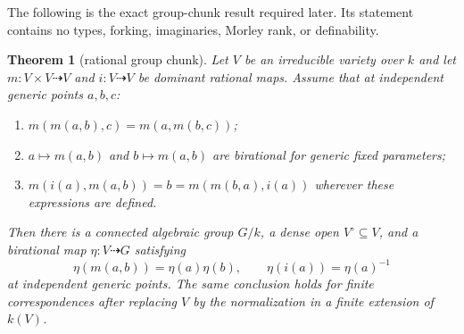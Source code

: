 \documentclass[11pt,oneside]{article}
\newtheorem{theorem}{Theorem}[section]
\theoremstyle{definition}
\theoremstyle{remark}
\begin{document}
The following is the exact group-chunk result required later.  Its statement contains no
types, forking, imaginaries, Morley rank, or definability.

\begin{theorem}[rational group chunk]\label{thm:rational-group-chunk}
Let $V$ be an irreducible variety over $k$ and let
$m:V\times V\dashrightarrow V$ and $i:V\dashrightarrow V$ be dominant rational maps.
Assume that at independent generic points $a,b,c$:
\begin{enumerate}[label=(\roman*),leftmargin=11mm]
\item $m(m(a,b),c)=m(a,m(b,c))$;
\item $a\mapsto m(a,b)$ and $b\mapsto m(a,b)$ are birational for generic fixed
parameters;
\item $m(i(a),m(a,b))=b=m(m(b,a),i(a))$ wherever these expressions are defined.
\end{enumerate}
Then there is a connected algebraic group $G/k$, a dense open $V^\circ\subseteq V$, and
a birational map $\eta:V\dashrightarrow G$ satisfying
\[
 \eta(m(a,b))=\eta(a)\eta(b),\qquad \eta(i(a))=\eta(a)^{-1}
\]
at independent generic points.  The same conclusion holds for finite correspondences
after replacing $V$ by the normalization in a finite extension of $k(V)$.
\end{theorem}
\end{document}
